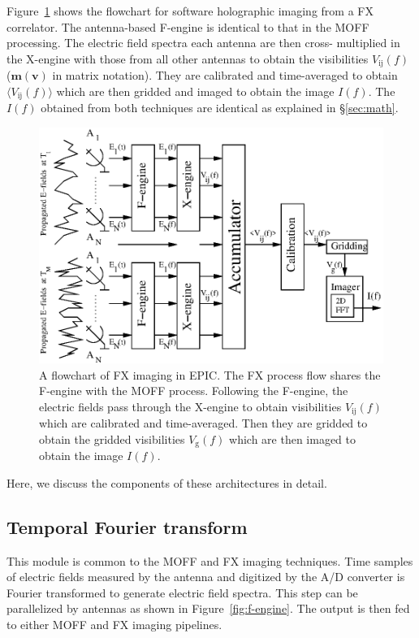 \documentclass[a4paper,fleqn,usenatbib]{../mnras}
\begin{document}
Figure~\ref{fig:FX-flowchart} shows the flowchart for software holographic
imaging from a FX correlator. The antenna-based F-engine is identical to that in
the MOFF processing. The electric field spectra each antenna are then cross-
multiplied in the X-engine with those from all other antennas to obtain the
visibilities $V_\textrm{ij}(f)$ ($\mathbf{m}(\mathbf{v})$ in matrix notation).
They are calibrated and time-averaged to obtain $\langle V_\textrm{ij}(f)\rangle$
which are then gridded and imaged to obtain the image $I(f)$. The $I(f)$ obtained
from both techniques are identical as explained in \S\ref{sec:math}.
\begin{figure}
  \includegraphics[width=\columnwidth]{FX_flowchart.eps}
  \caption{A flowchart of FX imaging in EPIC. The FX process flow shares the
    F-engine with the MOFF process. Following the F-engine, the electric fields
    pass through the X-engine to obtain visibilities $V_\textrm{ij}(f)$ which are
    calibrated and time-averaged. Then they are gridded to obtain the gridded
    visibilities $V_\textrm{g}(f)$ which are then imaged to obtain the image
    $I(f)$.}
  \label{fig:FX-flowchart}
\end{figure}

Here, we discuss the components of these architectures in detail. 

\subsection{Temporal Fourier transform}\label{sec:F-engine}

This module is common to the MOFF and FX imaging techniques. Time samples of
electric fields measured by the antenna and digitized by the A/D converter is
Fourier transformed to generate electric field spectra. This step can be
parallelized by antennas as shown in Figure~\ref{fig:f-engine}. The output is
then fed to either MOFF and FX imaging pipelines.
\end{document}
